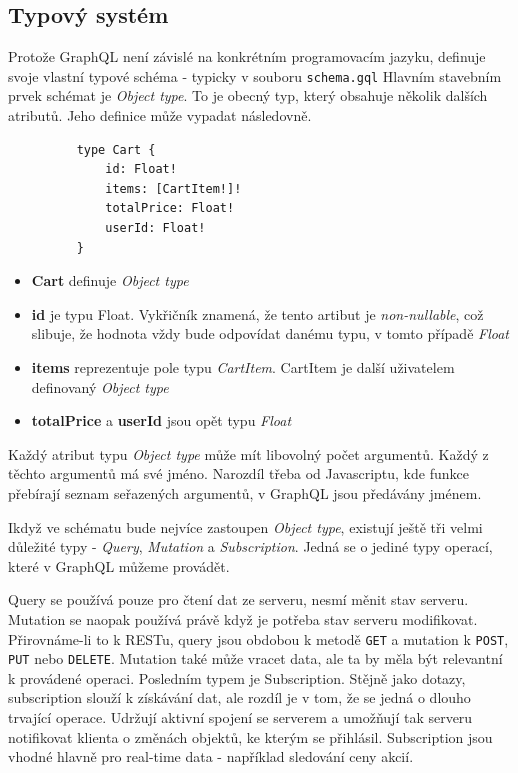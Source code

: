 \documentclass[thesis=M,czech]{FITthesis}[2019/12/23]
\begin{document}
\subsection{Typový systém}
Protože GraphQL není závislé na konkrétním programovacím jazyku, definuje svoje vlastní typové schéma - typicky v souboru \texttt{schema.gql}
Hlavním stavebním prvek schémat je \textit{Object type}. To je obecný typ, který obsahuje několik dalších atributů. Jeho definice může vypadat následovně. 
\begin{figure}[h]
\begin{verbatim}
    type Cart {
        id: Float!
        items: [CartItem!]!
        totalPrice: Float!
        userId: Float!
    }
\end{verbatim}
\end{figure}
\begin{itemize}
    \item \textbf{Cart} definuje \textit{Object type}
    \item \textbf{id} je typu Float. Vykřičník znamená, že tento artibut je \textit{non-nullable}, což slibuje, že hodnota vždy bude odpovídat danému typu, v tomto případě \textit{Float}
    \item \textbf{items} reprezentuje pole typu \textit{CartItem}. CartItem je další uživatelem definovaný \textit{Object type}
    \item \textbf{totalPrice} a \textbf{userId} jsou opět typu \textit{Float}
\end{itemize}

Každý atribut typu \textit{Object type} může mít libovolný počet argumentů. Každý z těchto argumentů má své jméno. Narozdíl třeba od Javascriptu, kde funkce přebírají seznam seřazených argumentů, v GraphQL jsou předávány jménem.

Ikdyž ve schématu bude nejvíce zastoupen \textit{Object type}, existují ještě tři velmi důležité typy - \textit{Query}, \textit{Mutation} a \textit{Subscription}. Jedná se o jediné typy operací, které v GraphQL můžeme provádět.

Query se používá pouze pro čtení dat ze serveru, nesmí měnit stav serveru. Mutation se naopak používá právě když je potřeba stav serveru modifikovat. Přirovnáme-li to k RESTu, query jsou obdobou k metodě \texttt{GET} a mutation k \texttt{POST}, \texttt{PUT} nebo \texttt{DELETE}. Mutation také může vracet data, ale ta by měla být relevantní k provádené operaci.
Posledním typem je Subscription. Stějně jako dotazy, subscription slouží k získávání dat, ale rozdíl je v tom, že se jedná o dlouho trvající operace. Udržují aktivní spojení se serverem a umožňují tak serveru notifikovat klienta o změnách objektů, ke kterým se přihlásil. Subscription jsou vhodné hlavně pro real-time data - například sledování ceny akcií.
\end{document}
